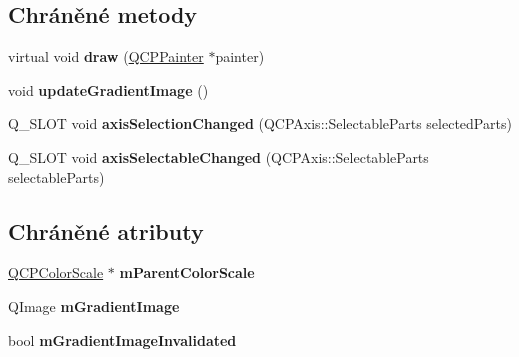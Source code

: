 \subsection*{Chráněné metody}
\begin{DoxyCompactItemize}
\item 
\hypertarget{classQCPColorScaleAxisRectPrivate_adb67bfe9057a9dd9a85f548c274e6d98}{}virtual void {\bfseries draw} (\hyperlink{classQCPPainter}{Q\+C\+P\+Painter} $\ast$painter)\label{classQCPColorScaleAxisRectPrivate_adb67bfe9057a9dd9a85f548c274e6d98}

\item 
\hypertarget{classQCPColorScaleAxisRectPrivate_a73754cab312aeaddea1bfcc67cc079ac}{}void {\bfseries update\+Gradient\+Image} ()\label{classQCPColorScaleAxisRectPrivate_a73754cab312aeaddea1bfcc67cc079ac}

\item 
\hypertarget{classQCPColorScaleAxisRectPrivate_a6112ad4291ac1695d37659cb049d598d}{}Q\+\_\+\+S\+L\+O\+T void {\bfseries axis\+Selection\+Changed} (Q\+C\+P\+Axis\+::\+Selectable\+Parts selected\+Parts)\label{classQCPColorScaleAxisRectPrivate_a6112ad4291ac1695d37659cb049d598d}

\item 
\hypertarget{classQCPColorScaleAxisRectPrivate_a66d2baed86966bb03a6d7c32dc7d59f7}{}Q\+\_\+\+S\+L\+O\+T void {\bfseries axis\+Selectable\+Changed} (Q\+C\+P\+Axis\+::\+Selectable\+Parts selectable\+Parts)\label{classQCPColorScaleAxisRectPrivate_a66d2baed86966bb03a6d7c32dc7d59f7}

\end{DoxyCompactItemize}
\subsection*{Chráněné atributy}
\begin{DoxyCompactItemize}
\item 
\hypertarget{classQCPColorScaleAxisRectPrivate_a311c73f51a4cb0b556388197833cf099}{}\hyperlink{classQCPColorScale}{Q\+C\+P\+Color\+Scale} $\ast$ {\bfseries m\+Parent\+Color\+Scale}\label{classQCPColorScaleAxisRectPrivate_a311c73f51a4cb0b556388197833cf099}

\item 
\hypertarget{classQCPColorScaleAxisRectPrivate_ad4f7c8ee1c6012d9950870811773119c}{}Q\+Image {\bfseries m\+Gradient\+Image}\label{classQCPColorScaleAxisRectPrivate_ad4f7c8ee1c6012d9950870811773119c}

\item 
\hypertarget{classQCPColorScaleAxisRectPrivate_a2c0b15b071e1f93006b48b5be022a631}{}bool {\bfseries m\+Gradient\+Image\+Invalidated}\label{classQCPColorScaleAxisRectPrivate_a2c0b15b071e1f93006b48b5be022a631}

\end{DoxyCompactItemize}
